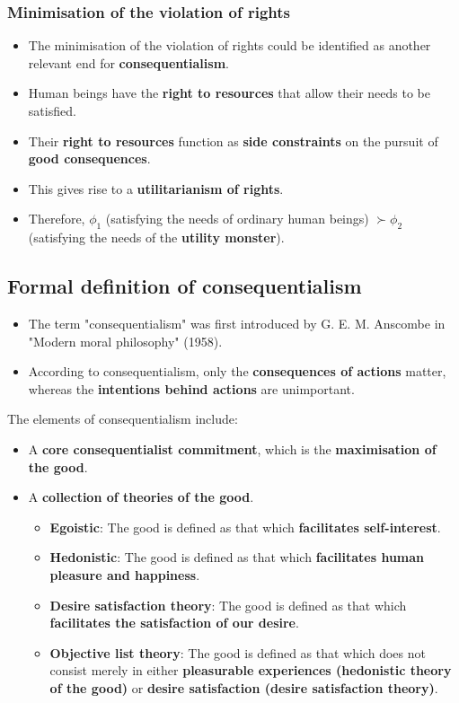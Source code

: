 \documentclass[11pt]{article}
\begin{document}
\subsubsection{Minimisation of the violation of rights}
\label{sec:org2d70ea4}
\begin{itemize}
\item The minimisation of the violation of rights could be identified as another relevant end for \textbf{consequentialism}.
\item Human beings have the \textbf{right to resources} that allow their needs to be satisfied.
\item Their \textbf{right to resources} function as \textbf{side constraints} on the pursuit of \textbf{good consequences}.
\item This gives rise to a \textbf{utilitarianism of rights}.
\item Therefore, \(\phi_1\) (satisfying the needs of ordinary human beings) \(\succ \phi_2\) (satisfying the needs of the \textbf{utility monster}).
\end{itemize}
\subsection{Formal definition of consequentialism}
\label{sec:org7baeed5}
\begin{itemize}
\item The term "consequentialism" was first introduced by G. E. M. Anscombe in "Modern moral philosophy" (1958).
\item According to consequentialism, only the \textbf{consequences of actions} matter, whereas the \textbf{intentions behind actions} are unimportant.
\end{itemize}

The elements of consequentialism include:
\begin{itemize}
\item A \textbf{core consequentialist commitment}, which is the \textbf{maximisation of the good}.
\item A \textbf{collection of theories of the good}.
\begin{itemize}
\item \textbf{Egoistic}: The good is defined as that which \textbf{facilitates self-interest}.
\item \textbf{Hedonistic}: The good is defined as that which \textbf{facilitates human pleasure and happiness}.
\item \textbf{Desire satisfaction theory}: The good is defined as that which \textbf{facilitates the satisfaction of our desire}.
\item \textbf{Objective list theory}: The good is defined as that which does not consist merely in either \textbf{pleasurable experiences (hedonistic theory of the good)} or \textbf{desire satisfaction (desire satisfaction theory)}.
\end{itemize}
\end{itemize}
\end{document}
